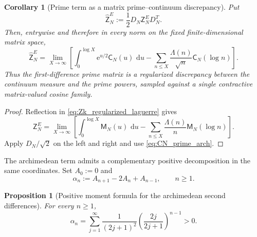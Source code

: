 \documentclass[11pt]{amsart}
\numberwithin{equation}{section}
\theoremstyle{plain}
\newtheorem{proposition}[theorem]{Proposition}
\newtheorem{corollary}[theorem]{Corollary}
\theoremstyle{definition}
\theoremstyle{remark}
\newcommand{\e}{\mathrm e}
\newcommand{\dd}{\,\mathrm d}
\begin{document}
\begin{corollary}[Prime term as a matrix prime--continuum discrepancy]
\label{cor:prime_continuum_matrix_discrepancy}
Put
\begin{equation}
 \widehat{\mathsf Z}_N^E
 :=\frac12D_N\mathsf Z_N^ED_N^T.
 \label{eq:Zhat_prime_arch}
\end{equation}
Then, entrywise and therefore in every norm on the fixed finite-dimensional matrix space,
\begin{equation}
 \boxed{
 \widehat{\mathsf Z}_N^E
 =\lim_{X\to\infty}
 \left[
 \int_0^{\log X}\e^{u/2}\mathsf C_N(u)\,\dd u
 -\sum_{n\le X}\frac{\Lambda(n)}{\sqrt n}
 \mathsf C_N(\log n)
 \right].}
 \label{eq:prime_continuum_matrix_discrepancy}
\end{equation}
Thus the first-difference prime matrix is a regularized discrepancy between the continuum measure and the prime powers, sampled against a single contractive matrix-valued cosine family.
\end{corollary}

\begin{proof}
Reflection in \eqref{eq:Zk_regularized_laguerre} gives
\begin{equation*}
 \mathsf Z_N^E
 =\lim_{X\to\infty}
 \left[
 \int_0^{\log X}\mathsf M_N(u)\,\dd u
 -\sum_{n\le X}\frac{\Lambda(n)}{n}\mathsf M_N(\log n)
 \right].
\end{equation*}
Apply $D_N/\sqrt2$ on the left and right and use
\eqref{eq:CN_prime_arch}.
\end{proof}

The archimedean term admits a complementary positive decomposition in the same coordinates.  Set $A_0:=0$ and
\begin{equation}
 \alpha_n:=A_{n+1}-2A_n+A_{n-1},
 \qquad n\ge1.
 \label{eq:alpha_prime_arch}
\end{equation}

\begin{proposition}[Positive moment formula for the archimedean second differences]
\label{prop:alpha_prime_arch}
For every $n\ge1$,
\begin{equation}
 \boxed{
 \alpha_n
 =\sum_{j=1}^{\infty}
 \frac1{(2j+1)^2}
 \left(\frac{2j}{2j+1}\right)^{n-1}>0.}
 \label{eq:alpha_prime_arch_series}
\end{equation}
\end{proposition}
\end{document}
